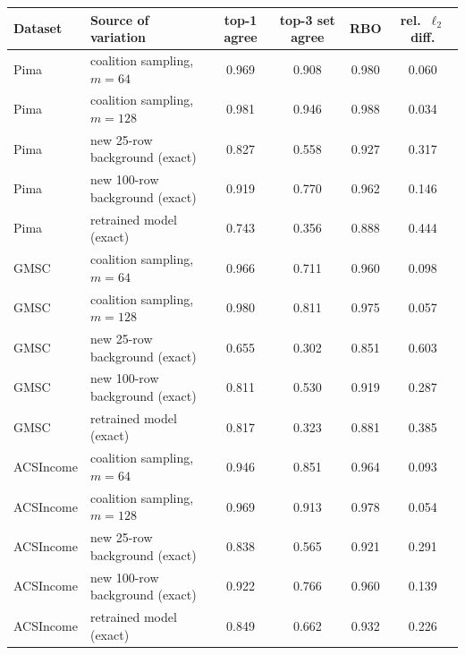 \begin{tabular}{llcccc}
\toprule
Dataset & Source of variation & top-1 agree & top-3 set agree & RBO & rel.\ $\ell_2$ diff.\\
\midrule
Pima & coalition sampling, $m{=}64$ & 0.969 & 0.908 & 0.980 & 0.060\\
Pima & coalition sampling, $m{=}128$ & 0.981 & 0.946 & 0.988 & 0.034\\
Pima & new 25-row background (exact) & 0.827 & 0.558 & 0.927 & 0.317\\
Pima & new 100-row background (exact) & 0.919 & 0.770 & 0.962 & 0.146\\
Pima & retrained model (exact) & 0.743 & 0.356 & 0.888 & 0.444\\
\midrule
GMSC & coalition sampling, $m{=}64$ & 0.966 & 0.711 & 0.960 & 0.098\\
GMSC & coalition sampling, $m{=}128$ & 0.980 & 0.811 & 0.975 & 0.057\\
GMSC & new 25-row background (exact) & 0.655 & 0.302 & 0.851 & 0.603\\
GMSC & new 100-row background (exact) & 0.811 & 0.530 & 0.919 & 0.287\\
GMSC & retrained model (exact) & 0.817 & 0.323 & 0.881 & 0.385\\
\midrule
ACSIncome & coalition sampling, $m{=}64$ & 0.946 & 0.851 & 0.964 & 0.093\\
ACSIncome & coalition sampling, $m{=}128$ & 0.969 & 0.913 & 0.978 & 0.054\\
ACSIncome & new 25-row background (exact) & 0.838 & 0.565 & 0.921 & 0.291\\
ACSIncome & new 100-row background (exact) & 0.922 & 0.766 & 0.960 & 0.139\\
ACSIncome & retrained model (exact) & 0.849 & 0.662 & 0.932 & 0.226\\
\bottomrule
\end{tabular}